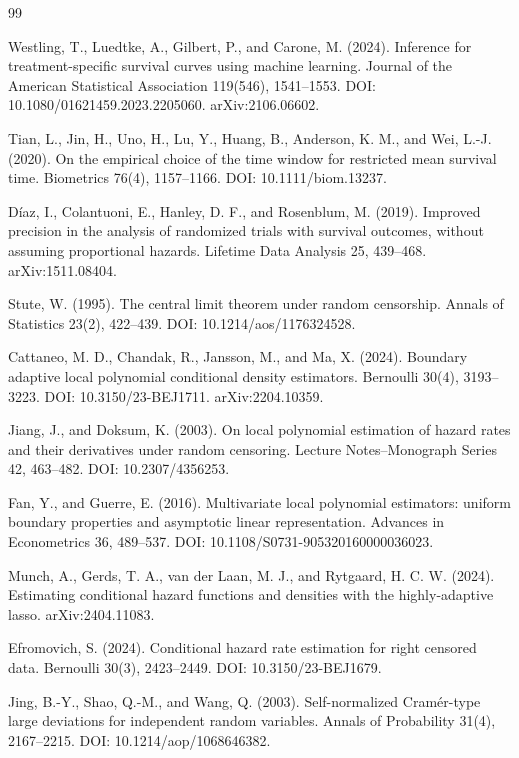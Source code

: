 \documentclass{article}
\begin{document}
\begin{thebibliography}{99}

   Westling, T., Luedtke, A., Gilbert, P., and Carone, M. (2024). Inference for treatment-specific survival curves using machine learning. Journal of the American Statistical Association 119(546), 1541--1553. DOI: 10.1080/01621459.2023.2205060. arXiv:2106.06602.

   Tian, L., Jin, H., Uno, H., Lu, Y., Huang, B., Anderson, K. M., and Wei, L.-J. (2020). On the empirical choice of the time window for restricted mean survival time. Biometrics 76(4), 1157--1166. DOI: 10.1111/biom.13237.

   Díaz, I., Colantuoni, E., Hanley, D. F., and Rosenblum, M. (2019). Improved precision in the analysis of randomized trials with survival outcomes, without assuming proportional hazards. Lifetime Data Analysis 25, 439--468. arXiv:1511.08404.

   Stute, W. (1995). The central limit theorem under random censorship. Annals of Statistics 23(2), 422--439. DOI: 10.1214/aos/1176324528.

   Cattaneo, M. D., Chandak, R., Jansson, M., and Ma, X. (2024). Boundary adaptive local polynomial conditional density estimators. Bernoulli 30(4), 3193--3223. DOI: 10.3150/23-BEJ1711. arXiv:2204.10359.

   Jiang, J., and Doksum, K. (2003). On local polynomial estimation of hazard rates and their derivatives under random censoring. Lecture Notes--Monograph Series 42, 463--482. DOI: 10.2307/4356253.

   Fan, Y., and Guerre, E. (2016). Multivariate local polynomial estimators: uniform boundary properties and asymptotic linear representation. Advances in Econometrics 36, 489--537. DOI: 10.1108/S0731-905320160000036023.

   Munch, A., Gerds, T. A., van der Laan, M. J., and Rytgaard, H. C. W. (2024). Estimating conditional hazard functions and densities with the highly-adaptive lasso. arXiv:2404.11083.

   Efromovich, S. (2024). Conditional hazard rate estimation for right censored data. Bernoulli 30(3), 2423--2449. DOI: 10.3150/23-BEJ1679.

   Jing, B.-Y., Shao, Q.-M., and Wang, Q. (2003). Self-normalized Cramér-type large deviations for independent random variables. Annals of Probability 31(4), 2167--2215. DOI: 10.1214/aop/1068646382.


\end{thebibliography}
\end{document}
